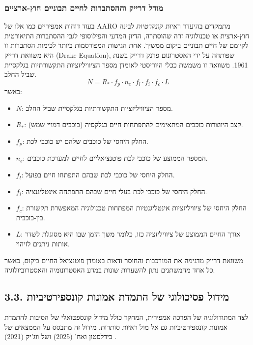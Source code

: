 \documentclass[12pt,a4paper]{article}
\begin{document}
\subsubsection{מודל דרייק וההסתברות לחיים תבוניים חוץ-ארציים}
בעוד דוחות אמפיריים כמו אלו של AARO מתמקדים בהיעדר ראיות \textit{קונקרטיות} לבינה חוץ-ארצית או טכנולוגיה זרה שהוסתרה, הדיון המדעי והפילוסופי לגבי ההסתברות התיאורטית לקיומם של חיים תבוניים ביקום ממשיך. אחת הגישות המפורסמות ביותר לכימות הסתברות זו היא משוואת דרייק (Drake Equation), שפותחה על ידי האסטרונום פרנק דרייק בשנת 1961. משוואה זו משמשת ככלי היוריסטי לאומדן מספר הציוויליזציות התקשורתיות בגלקסיית שביל החלב.
\begin{equation}
\label{eq:drake}
N = R_* \cdot f_p \cdot n_e \cdot f_l \cdot f_i \cdot f_c \cdot L
\end{equation}
כאשר:
\begin{itemize}
    \item $N$: מספר הציוויליזציות התקשורתיות בגלקסיית שביל החלב.
    \item $R_*$: קצב היווצרות כוכבים המתאימים להתפתחות חיים בגלקסיה (כוכבים דמויי שמש).
    \item $f_p$: החלק היחסי של כוכבים שלהם יש כוכבי לכת.
    \item $n_e$: המספר הממוצע של כוכבי לכת פוטנציאליים לחיים למערכת כוכבים.
    \item $f_l$: החלק היחסי של כוכבי לכת שבהם התפתחו חיים בפועל.
    \item $f_i$: החלק היחסי של כוכבי לכת בעלי חיים שבהם התפתחה אינטליגנציה.
    \item $f_c$: החלק היחסי של ציוויליזציות אינטליגנטיות המפתחות טכנולוגיה המאפשרת תקשורת בין-כוכבית.
    \item $L$: אורך החיים הממוצע של ציוויליזציה כזו, כלומר משך הזמן שבו היא מסוגלת לשדר אותות ניתנים לזיהוי.
\end{itemize}
משוואת דרייק מדגימה את המורכבות והחוסר ודאות באומדן פוטנציאל החיים ביקום, כאשר כל אחד מהמשתנים נתון להשערות שונות במדע האסטרונומיה והאסטרוביולוגיה.

\subsection{3.3. מידול פסיכולוגי של התמדת אמונות קונספירטיביות}
לצד המתודולוגיה של הפרכה אמפירית, המחקר כולל מידול קונספטואלי של הסיבות להתמדת אמונות קונספירטיביות גם אל מול ראיות סותרות. מידול זה מתבסס על הממצאים של בידלסטון ואח' (2025) \cite{4} ושל ווג'יק (2021) \cite{3}.
\end{document}
